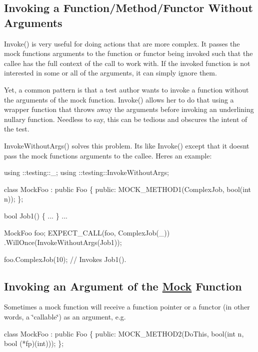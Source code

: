 \subsection*{Invoking a Function/\+Method/\+Functor Without Arguments}

{\ttfamily Invoke()} is very useful for doing actions that are more complex. It passes the mock function\textquotesingle{}s arguments to the function or functor being invoked such that the callee has the full context of the call to work with. If the invoked function is not interested in some or all of the arguments, it can simply ignore them.

Yet, a common pattern is that a test author wants to invoke a function without the arguments of the mock function. {\ttfamily Invoke()} allows her to do that using a wrapper function that throws away the arguments before invoking an underlining nullary function. Needless to say, this can be tedious and obscures the intent of the test.

{\ttfamily Invoke\+Without\+Args()} solves this problem. It\textquotesingle{}s like {\ttfamily Invoke()} except that it doesn\textquotesingle{}t pass the mock function\textquotesingle{}s arguments to the callee. Here\textquotesingle{}s an example\+:


\begin{DoxyCode}
using ::testing::\_;
using ::testing::InvokeWithoutArgs;

\textcolor{keyword}{class }MockFoo : \textcolor{keyword}{public} Foo \{
 \textcolor{keyword}{public}:
  MOCK\_METHOD1(ComplexJob, \textcolor{keywordtype}{bool}(\textcolor{keywordtype}{int} n));
\};

\textcolor{keywordtype}{bool} Job1() \{ ... \}
...

  MockFoo foo;
  EXPECT\_CALL(foo, ComplexJob(\_))
      .WillOnce(InvokeWithoutArgs(Job1));

  foo.ComplexJob(10);  \textcolor{comment}{// Invokes Job1().}
\end{DoxyCode}


\subsection*{Invoking an Argument of the \hyperlink{classMock}{Mock} Function}

Sometimes a mock function will receive a function pointer or a functor (in other words, a \char`\"{}callable\char`\"{}) as an argument, e.\+g.


\begin{DoxyCode}
\textcolor{keyword}{class }MockFoo : \textcolor{keyword}{public} Foo \{
 \textcolor{keyword}{public}:
  MOCK\_METHOD2(DoThis, \textcolor{keywordtype}{bool}(\textcolor{keywordtype}{int} n, \textcolor{keywordtype}{bool} (*fp)(\textcolor{keywordtype}{int})));
\};
\end{DoxyCode}


